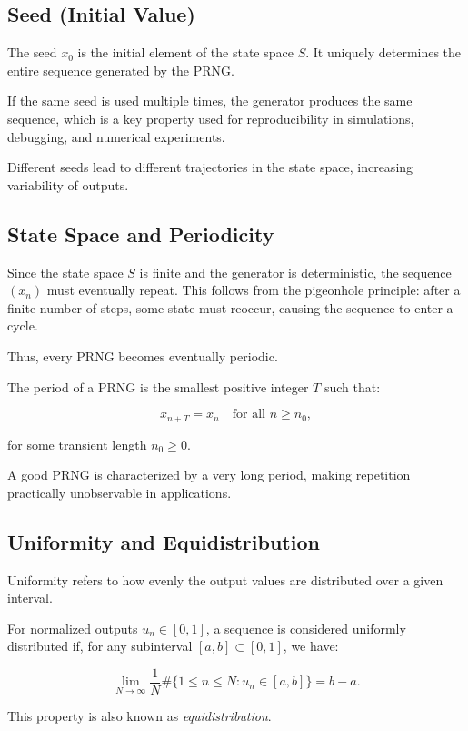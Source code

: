 \subsection{Seed (Initial Value)}

The seed $x_0$ is the initial element of the state space $S$. It uniquely determines the entire sequence generated by the PRNG.

If the same seed is used multiple times, the generator produces the same sequence, which is a key property used for reproducibility in simulations, debugging, and numerical experiments.

Different seeds lead to different trajectories in the state space, increasing variability of outputs.

\subsection{State Space and Periodicity}

Since the state space $S$ is finite and the generator is deterministic, the sequence $(x_n)$ must eventually repeat. This follows from the pigeonhole principle: after a finite number of steps, some state must reoccur, causing the sequence to enter a cycle.

Thus, every PRNG becomes eventually periodic.

The period of a PRNG is the smallest positive integer $T$ such that:

$$
x_{n+T} = x_n \quad \text{for all } n \ge n_0,
$$

for some transient length $n_0 \ge 0$.

A good PRNG is characterized by a very long period, making repetition practically unobservable in applications.

\subsection{Uniformity and Equidistribution}

Uniformity refers to how evenly the output values are distributed over a given interval.

For normalized outputs $u_n \in [0,1]$, a sequence is considered uniformly distributed if, for any subinterval $[a,b] \subset [0,1]$, we have:

$$
\lim_{N \to \infty}
\frac{1}{N} \#\{1 \le n \le N : u_n \in [a,b]\}
= b - a.
$$

This property is also known as \textit{equidistribution}.


